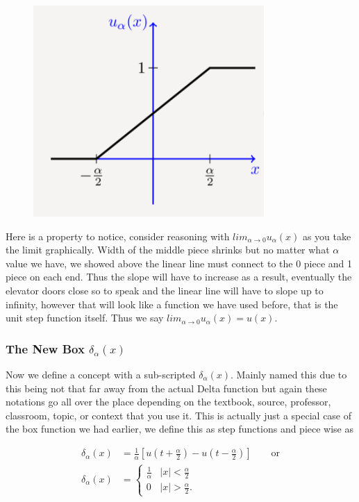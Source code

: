 \documentclass[12pt]{article}
\begin{document}
\begin{figure}[!htbp]
\centering
\includegraphics[scale=.7]{step8.PNG}
\label{fig:hsf8}
\end{figure}

Here is a property to notice, consider reasoning with $lim_{\alpha\rightarrow0} u_{\alpha}(x)$ as you take the limit graphically. Width of the middle piece shrinks but no matter what $\alpha$ value we have, we showed above the linear line must connect to the 0 piece and 1 piece on each end. Thus the slope will have to increase as a result, eventually the elevator doors close so to speak and the linear line will have to slope up to infinity, however that will look like a function we have used before, that is the unit step function itself. Thus we say $lim_{\alpha\rightarrow0} u_{\alpha}(x)=u(x)$. \\

\subsubsection{The New Box $\delta_{\alpha}(x)$}

Now we define a concept with a sub-scripted $\delta_{\alpha}(x)$. Mainly named this due to this being not that far away from the actual Delta function but again these notations go all over the place depending on the textbook, source, professor, classroom, topic, or context that you use it. This is actually just a special case of the box function we had earlier, we define this as step functions and piece wise as

\begin{align*}
    \delta_{\alpha}(x) &= \frac{1}{\alpha}\left[u(t+\frac{\alpha}{2})-u(t-\frac{\alpha}{2})\right]  \qquad \text{or}\\
    \delta_{\alpha}(x) &= \left\{
        \begin{array}{cc}
            \frac{1}{\alpha} &  |x| < \frac{\alpha}{2}  \\
            0 & |x| > \frac{\alpha}{2}.
        \end{array}
    \right.
\end{align*}
\end{document}
